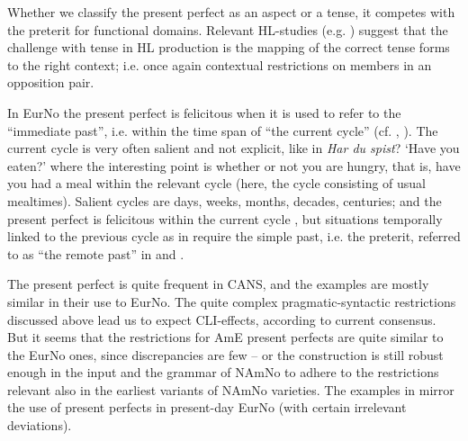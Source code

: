 \documentclass[output=paper]{langscibook}
\begin{document}
Whether we classify the present perfect as an aspect or a tense, it competes with the preterit for functional domains. Relevant HL-studies (e.g. \citealt{Montrul2016, Fenyvesi2000}) suggest that the challenge with tense in HL production is the mapping of the correct tense forms to the right context; i.e. once again contextual restrictions on members in an opposition pair. 

In EurNo the present perfect is felicitous when it is used to refer to the “immediate past”, i.e. within the time span of “the current cycle” (cf. \citealt{Eide2020Modality}, \citealt{EideFryd2021}). The current cycle is very often salient and not explicit, like in \textit{Har du spist}? ‘Have you eaten?’ where the interesting point is whether or not you are hungry, that is, have you had a meal within the relevant cycle (here, the cycle consisting of usual mealtimes). Salient cycles are days, weeks, months, decades, centuries; and the present perfect is felicitous within the current cycle , but situations temporally linked to the previous cycle as in  require the simple past, i.e. the preterit, referred to as “the remote past” in \citet{Eide2020Modality} and \citet{EideFryd2021}. 

\ea%
    \label{ex:eide:22}
    \z %
\z

The present perfect is quite frequent in CANS, and the examples are mostly similar in their use to EurNo. The quite complex pragmatic-syntactic restrictions discussed above lead us to expect CLI-effects, according to current consensus. But it seems that the restrictions for AmE present perfects are quite similar to the EurNo ones, since discrepancies are few – or the construction is still robust enough in the input and the grammar of NAmNo to adhere to the restrictions relevant also in the earliest variants of NAmNo varieties. The examples in  mirror the use of present perfects in present-day EurNo (with certain irrelevant deviations).
\end{document}
